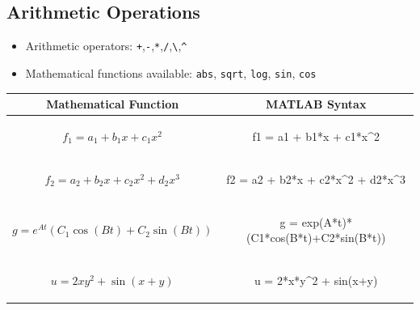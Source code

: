 \documentclass{lab_sheet}
\begin{document}
\subsection{Arithmetic Operations}
\begin{itemize}
    \item Arithmetic operators: \verb|+|,\verb|-|,\verb|*|,\verb|/|,\verb|\|,\verb|^| 
    \item Mathematical functions available: \texttt{abs}, \texttt{sqrt}, \texttt{log}, \texttt{sin}, \texttt{cos}
\end{itemize}
\begin{table}[H]
    \centering
    \begin{tabular}{ |c|c| }
        \hline
        \textbf{Mathematical Function}&\textbf{MATLAB Syntax}\\
        \hline\hline
        $f_1=a_1+b_1x+c_1x^2$ & 
        \begin{tblCode}
f1 = a1 + b1*x + c1*x^2
        \end{tblCode}
        \\
        \hline
        $f_2=a_2+b_2x+c_2x^2+d_2x^3$ & 
        \begin{tblCode}
f2 = a2 + b2*x + c2*x^2 + d2*x^3
        \end{tblCode}
        \\
        \hline
        $g=e^{At}\left(C_1\cos(Bt)+C_2\sin(Bt)\right)$ & 
        \begin{tblCode}
g = exp(A*t)*(C1*cos(B*t)+C2*sin(B*t))
        \end{tblCode}
        \\
        \hline
        $u=2xy^2+\sin(x+y)$ & 
        \begin{tblCode}
u = 2*x*y^2 + sin(x+y)
        \end{tblCode}
        \\
        \hline
    \end{tabular}
\end{table}
\end{document}
